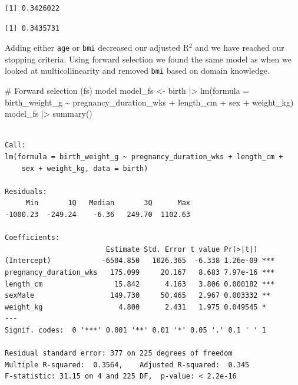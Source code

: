\documentclass[
  letterpaper,
  DIV=11,
  numbers=noendperiod]{scrreprt}
\newenvironment{Shaded}{\begin{snugshade}}{\end{snugshade}}
\newcommand{\AttributeTok}[1]{\textcolor[rgb]{0.40,0.45,0.13}{#1}}
\newcommand{\CommentTok}[1]{\textcolor[rgb]{0.37,0.37,0.37}{#1}}
\newcommand{\FunctionTok}[1]{\textcolor[rgb]{0.28,0.35,0.67}{#1}}
\newcommand{\NormalTok}[1]{\textcolor[rgb]{0.00,0.23,0.31}{#1}}
\newcommand{\OtherTok}[1]{\textcolor[rgb]{0.00,0.23,0.31}{#1}}
\newcommand{\SpecialCharTok}[1]{\textcolor[rgb]{0.37,0.37,0.37}{#1}}
\begin{document}
\begin{verbatim}
[1] 0.3426022
\end{verbatim}

\begin{Shaded}
\end{Shaded}

\begin{verbatim}
[1] 0.3435731
\end{verbatim}

Adding either \texttt{age} or \texttt{bmi} decreased our adjusted
R\(^2\) and we have reached our stopping criteria. Using forward
selection we found the same model as when we looked at multicollinearity
and removed \texttt{bmi} based on domain knowledge.

\begin{Shaded}
\begin{Highlighting}[]
\CommentTok{\# Forward selection (fs) model}
\NormalTok{model\_fs }\OtherTok{\textless{}{-}}\NormalTok{ birth }\SpecialCharTok{|\textgreater{}} \FunctionTok{lm}\NormalTok{(}\AttributeTok{formula =}\NormalTok{ birth\_weight\_g }\SpecialCharTok{\textasciitilde{}}\NormalTok{ pregnancy\_duration\_wks }\SpecialCharTok{+}\NormalTok{ length\_cm }\SpecialCharTok{+}\NormalTok{ sex }\SpecialCharTok{+}\NormalTok{ weight\_kg)}
\NormalTok{model\_fs }\SpecialCharTok{|\textgreater{}} \FunctionTok{summary}\NormalTok{()}
\end{Highlighting}
\end{Shaded}

\begin{verbatim}

Call:
lm(formula = birth_weight_g ~ pregnancy_duration_wks + length_cm + 
    sex + weight_kg, data = birth)

Residuals:
     Min       1Q   Median       3Q      Max 
-1000.23  -249.24    -6.36   249.70  1102.63 

Coefficients:
                        Estimate Std. Error t value Pr(>|t|)    
(Intercept)            -6504.850   1026.365  -6.338 1.26e-09 ***
pregnancy_duration_wks   175.099     20.167   8.683 7.97e-16 ***
length_cm                 15.842      4.163   3.806 0.000182 ***
sexMale                  149.730     50.465   2.967 0.003332 ** 
weight_kg                  4.800      2.431   1.975 0.049545 *  
---
Signif. codes:  0 '***' 0.001 '**' 0.01 '*' 0.05 '.' 0.1 ' ' 1

Residual standard error: 377 on 225 degrees of freedom
Multiple R-squared:  0.3564,    Adjusted R-squared:  0.345 
F-statistic: 31.15 on 4 and 225 DF,  p-value: < 2.2e-16
\end{verbatim}
\end{document}
